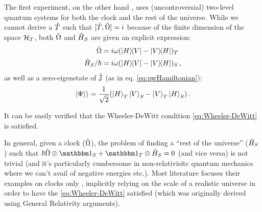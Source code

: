 The first experiment, on the other hand \parencite{Moreva:illustration,Moreva:synthetic},
uses (uncontroversial)
two-level quantum systems for both the clock and the rest of the universe.
While we cannot derive a $\hat{T}$ such that $[\hat{T}, \hat{\Omega}] = i$
because of the finite dimension of the space $\mathcal{H}_T$, both $\hat{\Omega}$
and $\hat{H}_S$ are given an explicit expression:
\begin{align}\label{eq:MorevaOmegaT}
  \hat{\Omega}            &= i\omega(\ketbra{H}{V}- \ketbra{V}{H})_T \\
  \hat{H}_S/{\hbar}       &= i\omega(\ketbra{H}{V}- \ketbra{V}{H})_S
  \,\text{,}
\end{align}
as well as a zero-eigenstate of $\hat{\mathbb{J}}$ (as in eq. \ref{eq:pwHamiltonian}):
\begin{equation}\label{eq:moreva:overall_state}
  \left.\left| \Psi \right\rangle\right\rangle = \frac{1}{\sqrt{2}}\qty(\ket{H}_T\ket{V}_S-\ket{V}_T\ket{H}_S)
  \,\text{.}
\end{equation}

It can be easily verified that the Wheeler-DeWitt condition
\eqref{eq:Wheeler-DeWitt} is satisfied.

In general, given a clock ($\hat{\Omega}$), the problem of finding a
``rest of the universe'' ($\hat{H}_S$) such that
$\hbar\op{\Omega}\ox\idop_S + \idop_T\ox\op{H}_S = 0$
(and vice versa)
is not trivial
(and it's particularly cumbersome in non-relativisitc
quantum mechanics where we can't avail of negative energies etc.).
Most literature focuses their examples on clocks only
\parencite{Prvanovic,RealisticClocks,HarmonicClocks},
implicitly relying on the scale of a realistic universe
in order to have the \eqref{eq:Wheeler-DeWitt} satisfied
(which was originally derived using General Relativity arguments).

